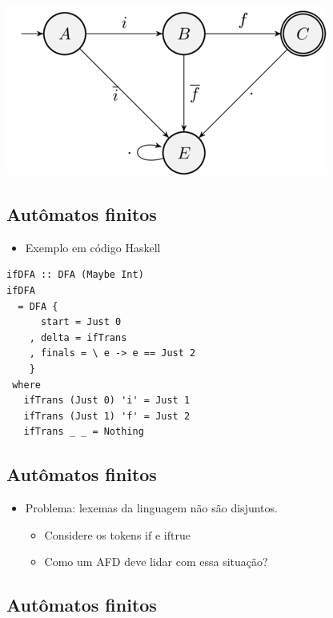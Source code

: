 \documentclass[11pt]{article}
\begin{document}
\begin{center}
\includegraphics[width=.9\linewidth]{./imgs/image2.png}
\end{center}
\subsection*{Autômatos finitos}
\label{sec:orgefb5cac}

\begin{itemize}
\item Exemplo em código Haskell
\end{itemize}

\begin{verbatim}
ifDFA :: DFA (Maybe Int)
ifDFA
  = DFA {
      start = Just 0
    , delta = ifTrans
    , finals = \ e -> e == Just 2
    }
 where
   ifTrans (Just 0) 'i' = Just 1
   ifTrans (Just 1) 'f' = Just 2
   ifTrans _ _ = Nothing
\end{verbatim}
\subsection*{Autômatos finitos}
\label{sec:org58246ca}

\begin{itemize}
\item Problema: lexemas da linguagem não são disjuntos.
\begin{itemize}
\item Considere os tokens \(\mathrm{if}\) e \(\mathrm{iftrue}\)
\item Como um AFD deve lidar com essa situação?
\end{itemize}
\end{itemize}
\subsection*{Autômatos finitos}
\label{sec:org0678136}
\end{document}
